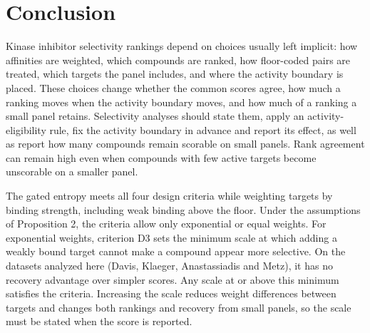 \section{Conclusion}
\label{sec:conclusion}

Kinase inhibitor selectivity rankings depend on choices usually left implicit:
how affinities are weighted, which compounds are ranked, how floor-coded
pairs are treated, which targets the panel includes, and where the
activity boundary is placed. These choices change whether the common scores
agree, how much a ranking moves when the activity boundary moves, and how much
of a ranking a small panel retains. Selectivity analyses should state
them, apply an activity-eligibility rule, fix the activity boundary in advance
and report its effect, as well as report how many compounds remain scorable on small
panels. Rank agreement can remain high even when compounds with few active
targets become unscorable on a smaller panel.

The gated entropy meets all four design criteria while weighting targets by
binding strength, including weak binding above the floor. Under the
assumptions of Proposition 2, the criteria allow only exponential or equal
weights. For exponential weights, criterion D3 sets the minimum scale at which adding
a weakly bound target cannot make a compound appear more selective.
On the datasets analyzed here (Davis, Klaeger, Anastassiadis and Metz), 
it has no recovery advantage over
simpler scores. Any scale at or above this minimum satisfies the criteria.
Increasing the scale reduces weight differences between targets and changes both
rankings and recovery from small panels, so the scale must be stated
when the score is reported.
